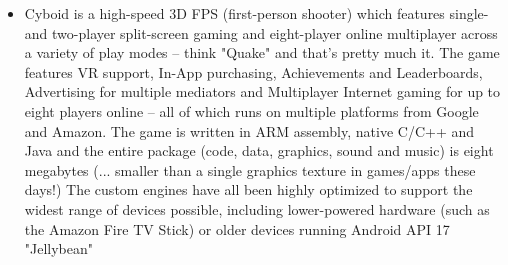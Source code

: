 {\begin{itemize}
      \item Cyboid is a high-speed 3D FPS (first-person shooter) which features single- and two-player split-screen gaming and eight-player online multiplayer across a variety of play modes -- think "Quake" and that's pretty much it. The game features VR support, In-App purchasing, Achievements and Leaderboards, Advertising for multiple mediators and Multiplayer Internet gaming for up to eight players online -- all of which runs on multiple platforms from Google and Amazon. The game is written in ARM assembly, native C/C++ and Java and the entire package (code, data, graphics, sound and music) is eight megabytes (... smaller than a single graphics texture in games/apps these days!) The custom engines have all been highly optimized to support the widest range of devices possible, including lower-powered hardware (such as the Amazon Fire TV Stick) or older devices running Android API 17 "Jellybean"
     \end{itemize}
     }
 




